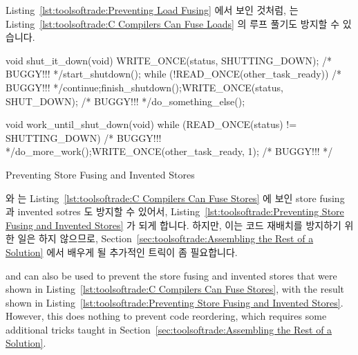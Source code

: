 Listing~\ref{lst:toolsoftrade:Preventing Load Fusing} 에서 보인 것처럼,
 는
Listing~\ref{lst:toolsoftrade:C Compilers Can Fuse Loads} 의 루프 풀기도 방지할
수 있습니다.

\begin{listing}[tbp]
\begin{fcvlabel}
\begin{VerbatimL}[commandchars=\\\[\]]
void shut_it_down(void)
{
	WRITE_ONCE(status, SHUTTING_DOWN); /* BUGGY!!! */\lnlbl[store:a]
	start_shutdown();
	while (!READ_ONCE(other_task_ready)) /* BUGGY!!! */\lnlbl[loop:b]
		continue;\lnlbl[loop:e]
	finish_shutdown();\lnlbl[finish]
	WRITE_ONCE(status, SHUT_DOWN); /* BUGGY!!! */\lnlbl[store:b]
	do_something_else();
}

void work_until_shut_down(void)
{
	while (READ_ONCE(status) != SHUTTING_DOWN) /* BUGGY!!! */
		do_more_work();
	WRITE_ONCE(other_task_ready, 1); /* BUGGY!!! */
}
\end{VerbatimL}
\end{fcvlabel}
\caption{Preventing Store Fusing and Invented Stores}
\label{lst:toolsoftrade:Preventing Store Fusing and Invented Stores}
\end{listing}

 와  는
Listing~\ref{lst:toolsoftrade:C Compilers Can Fuse Stores} 에 보인 store fusing
과 invented sotres 도 방지할 수 있어서,
Listing~\ref{lst:toolsoftrade:Preventing Store Fusing and Invented Stores} 가
되게 합니다.
하지만, 이는 코드 재배치를 방지하기 위한 일은 하지 않으므로,
Section~\ref{sec:toolsoftrade:Assembling the Rest of a Solution} 에서 배우게 될
추가적인 트릭이 좀 필요합니다.

\iffalse

 and  can also be used to prevent the
store fusing and invented stores that were shown in
Listing~\ref{lst:toolsoftrade:C Compilers Can Fuse Stores},
with the result shown in
Listing~\ref{lst:toolsoftrade:Preventing Store Fusing and Invented Stores}.
However, this does nothing to prevent code reordering, which requires
some additional tricks taught in
Section~\ref{sec:toolsoftrade:Assembling the Rest of a Solution}.

